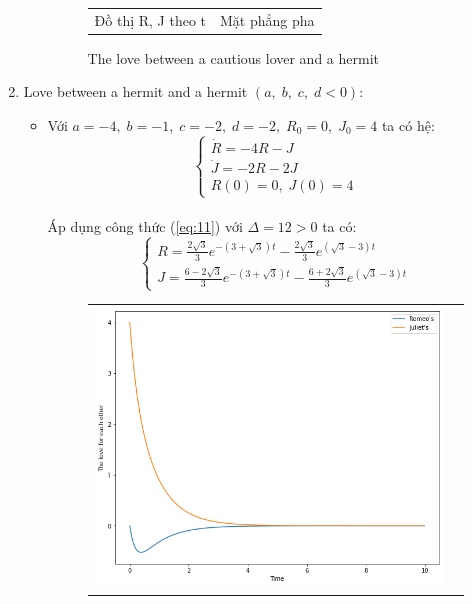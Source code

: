 \documentclass[a4paper]{article}
\begin{document}
\begin{enumerate}
\begin{itemize}
\begin{figure}[htp]
\begin{tabular}{cc}
            Đồ thị R, J theo t & Mặt phẳng pha
        \end{tabular}
        \caption{The love between a cautious lover and a hermit}
    \end{figure}
    \end{itemize}
\newpage
\item
Love between a hermit and a hermit $(a,\;b,\;c,\;d < 0)$:
    \begin{itemize}
    \item Với $a = -4,\;b = -1,\;c = -2,\;d = -2,\;R_0 = 0,\;J_0 = 4$ ta có hệ:
    $$\begin{cases} \dot{R}=-4R-J \\ \dot{J}=-2R-2J \\ R(0)=0,\;J(0)=4 \end{cases}$$ \\
    Áp dụng công thức (\ref{eq:11}) với $\Delta = 12 > 0$ ta có:
    $$\begin{cases}
        R = \frac{2\sqrt{3}}{3}e^{-(3+\sqrt{3})t} - \frac{2\sqrt{3}}{3}e^{(\sqrt{3}-3)t} \\[4pt]
        J = \frac{6-2\sqrt{3}}{3}e^{-(3+\sqrt{3})t} - \frac{6+2\sqrt{3}}{3}e^{(\sqrt{3}-3)t}
    \end{cases}$$
    \begin{figure}[htp]
        \centering
        \begin{tabular}{cc}
            \includegraphics[scale = .33]{Images/Bt2/10.1_gr.png} &

\end{tabular}
\end{figure}
\end{itemize}
\end{enumerate}
\end{document}
